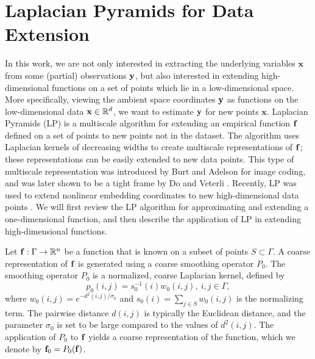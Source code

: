 \section{Laplacian Pyramids for Data Extension} \label{sec:LapPyr}

In this work, we are not only interested in extracting the underlying variables $\mathbf{x}$ from some (partial) observations $\mathbf{y}$,
but also interested in extending high-dimensional functions on a set of points which lie in a low-dimensional space.
%
More specifically, viewing the ambient space coordinates $\mathbf{y}$ as functions on the low-dimensional data $\mathbf{x} \in \mathbb{R}^d$,
we want to estimate $\mathbf{y}$ for new points $\mathbf{x}$.
%
Laplacian Pyramids (LP) is a multiscale algorithm for extending an empirical function $\mathbf{f}$ defined on a set of points
to new points not in the dataset.
%
The algorithm uses Laplacian kernels of decreasing widths to create multiscale representations of $\mathbf{f}$;
these representations can be easily extended to new data points.
%
This type of multiscale representation was introduced by Burt and Adelson \cite{burt1983laplacian} for image coding,
and was later shown to be a tight frame by Do and Veterli \cite{do2003framing}.
%
Recently, LP was used to extend nonlinear embedding coordinates to new high-dimensional data points \cite{rabin2012heterogeneous}.
%
We will first review the LP algorithm for approximating and extending a one-dimensional function,
and then describe the application of LP in extending high-dimensional functions.

Let $\mathbf{f}: \Gamma \rightarrow \mathbb{R}^n$ be a function that is known on a subset of points $S \subset \Gamma$.
%
A coarse representation of $\mathbf{f}$ is generated using a coarse smoothing operator $P_0$.
%
The smoothing operator $P_0$ is a normalized, coarse Laplacian kernel, defined by
\begin{equation}
p_0(i, j)= s_0^{-1}(i)w_0(i, j),\: i, j \in \Gamma,
\end{equation}
where $w_0(i, j)=e^{-d^2(i, j) / \sigma_0}$ and $s_0(i)=\sum_{j \in S}w_0(i, j)$ is the normalizing term.
%
The pairwise distance $d(i, j)$ is typically the Euclidean distance, and the parameter $\sigma_0$ is set to be large compared to the values of $d^2(i, j)$.
%
The application of $P_0$ to $\mathbf{f}$ yields a coarse representation of the function, which we denote by $\mathbf{f}_0=P_0(\mathbf{f})$.


